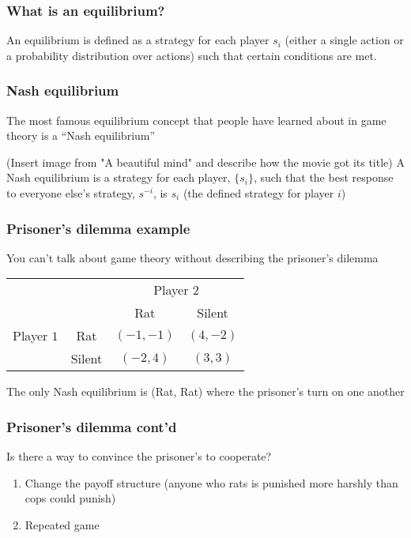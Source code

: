 \documentclass[10pt]{beamer}
\begin{document}
  \begin{frame} \frametitle{What is an equilibrium?}

    An equilibrium is defined as a strategy for each player $s_i$ (either a single action or a
    probability distribution over actions) such that certain conditions are met.

  \end{frame}

  \begin{frame} \frametitle{Nash equilibrium}

      The most famous equilibrium concept that people have learned about in game theory is a ``Nash
      equilibrium''

      (Insert image from "A beautiful mind" and describe how the movie got its title)
      A Nash equilibrium is a strategy for each player, $\{s_i\}$, such that the best response to
      everyone else's strategy, $s^{-i}$, is $s_i$ (the defined strategy for player $i$)

  \end{frame}

  \begin{frame} \frametitle{Prisoner's dilemma example}
    You can't talk about game theory without describing the prisoner's dilemma

    \begin{center}
    \begin{tabular}{cc|c|c|}
      & \multicolumn{1}{c}{} & \multicolumn{2}{c}{Player $2$} \\
      & \multicolumn{1}{c}{} & \multicolumn{1}{c}{Rat}  & \multicolumn{1}{c}{Silent} \\\cline{3-4}
      Player $1$ & Rat & $(-1, -1)$ & $(4, -2)$ \\ \cline{3-4}
      & Silent & $(-2, 4)$ & $(3, 3)$ \\\cline{3-4}
    \end{tabular}
    \end{center}

    The only Nash equilibrium is (Rat, Rat) where the prisoner's turn on one another

  \end{frame}

  \begin{frame} \frametitle{Prisoner's dilemma cont'd}
    Is there a way to convince the prisoner's to cooperate?

    \begin{enumerate}
      \item Change the payoff structure (anyone who rats is punished more harshly than cops could punish)
      \item Repeated game
    \end{enumerate}

  \end{frame}
\end{document}
